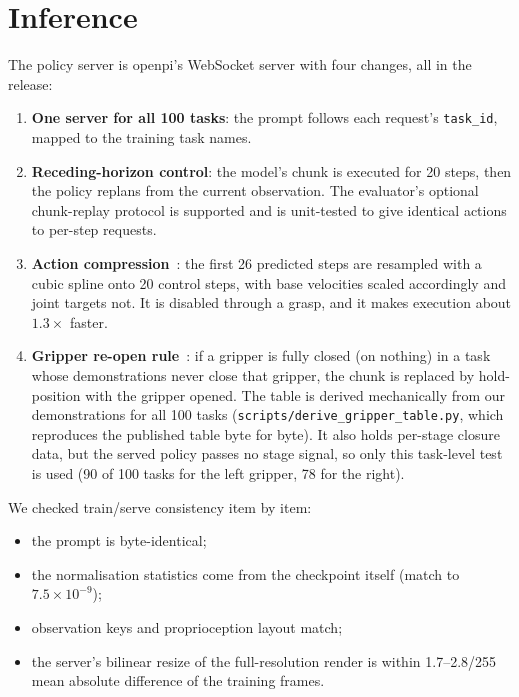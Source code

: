 \documentclass[10pt]{article}
\begin{document}
\section{Inference}
\label{sec:inference}
The policy server is openpi's WebSocket server with four changes, all in the release:
\begin{enumerate}
\item \textbf{One server for all 100 tasks}: the prompt follows each request's \texttt{task\_id}, mapped to the
  training task names.
\item \textbf{Receding-horizon control}: the model's chunk is executed for 20 steps, then the policy replans from
  the current observation. The evaluator's optional chunk-replay protocol is supported and is unit-tested to give
  identical actions to per-step requests.
\item \textbf{Action compression}~\cite{rlc2025}: the first 26 predicted steps are resampled with a cubic spline onto
  20 control steps, with base velocities scaled accordingly and joint targets not. It is disabled through a grasp, and it makes execution about $1.3\times$ faster.
\item \textbf{Gripper re-open rule}~\cite{rlc2025}: if a gripper is fully closed (on nothing) in a task whose demonstrations never close that gripper, the chunk is replaced by hold-position with the gripper opened. The table is derived mechanically from our demonstrations for all 100 tasks (\texttt{scripts/derive\_gripper\_table.py}, which reproduces the published table byte for byte). It also holds per-stage closure data, but the served policy passes no stage signal, so only this task-level test is used (90 of 100 tasks for the left gripper, 78 for the right).
\end{enumerate}

We checked train/serve consistency item by item:
\begin{itemize}
\item the prompt is byte-identical;
\item the normalisation statistics come from the checkpoint itself (match to $7.5\times10^{-9}$);
\item observation keys and proprioception layout match;
\item the server's bilinear resize of the full-resolution render is within 1.7--2.8/255 mean absolute difference of
  the training frames.
\end{itemize}
\end{document}
